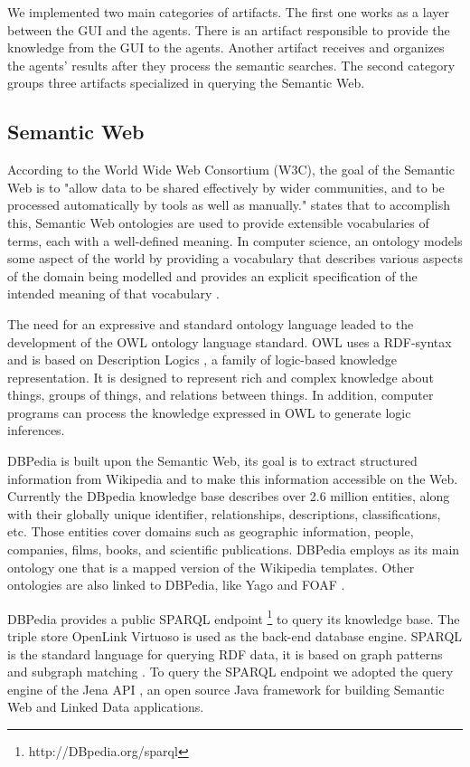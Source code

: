 \documentclass[a4paper,twoside]{article}
\begin{document}
We implemented two main categories of artifacts. The first one works as a layer between the GUI and the agents. There is an artifact responsible to provide the knowledge from the GUI to the agents. Another artifact receives and organizes the agents' results after they process the semantic searches. The second category groups three artifacts specialized in querying the Semantic Web.

\subsection{Semantic Web}

\noindent According to the World Wide Web Consortium (W3C), the goal of the Semantic Web is to "allow data to be shared effectively by wider communities, and to be processed automatically by tools as well as manually." \cite{ref53} states that to accomplish this, Semantic Web ontologies are used to provide extensible vocabularies of terms, each with a well-defined meaning. In computer science, an ontology models some aspect of the world by providing a vocabulary that describes various aspects of the domain being modelled and provides an explicit specification of the intended meaning of that vocabulary \cite{ref53}.

The need for an expressive and standard ontology language leaded to the development of the OWL ontology language standard. OWL uses a RDF-syntax and is based on Description Logics \cite{refDL}, a family of logic-based knowledge representation. It is designed to represent rich and complex knowledge about things, groups of things, and relations between things. In addition, computer programs can process the knowledge expressed in OWL to generate logic inferences.

DBPedia \cite{refXYZ} is built upon the Semantic Web, its goal is to extract structured information from Wikipedia and to make this information accessible on the Web. Currently the DBpedia knowledge base describes over 2.6 million entities, along with their globally unique identiﬁer, relationships, descriptions, classifications, etc. Those entities cover domains such as geographic information, people, companies, films, books, and scientiﬁc publications. DBPedia employs as its main ontology one that is a mapped version of the Wikipedia templates. Other ontologies are also linked to DBPedia, like Yago \cite{refYAGO} and FOAF \cite{refFOAF}.

DBPedia provides a public SPARQL endpoint \footnote{http://DBpedia.org/sparql} to query its knowledge base. The triple store OpenLink Virtuoso \cite{refVIRT} is used as the back-end database engine. SPARQL is the standard language for querying RDF data, it is based on graph patterns and subgraph matching \cite{refABC,refDEF}. To query the SPARQL endpoint we adopted the query engine of the Jena API \cite{refJENA}, an open source Java framework for building Semantic Web and Linked Data applications.
\end{document}

